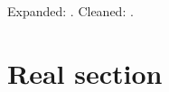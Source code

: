 \documentclass{article}
\begin{document}
Expanded: \GetTitleStringResult.
Cleaned: \GetTitleStringResult.
\section{Real section}
\end{document}
